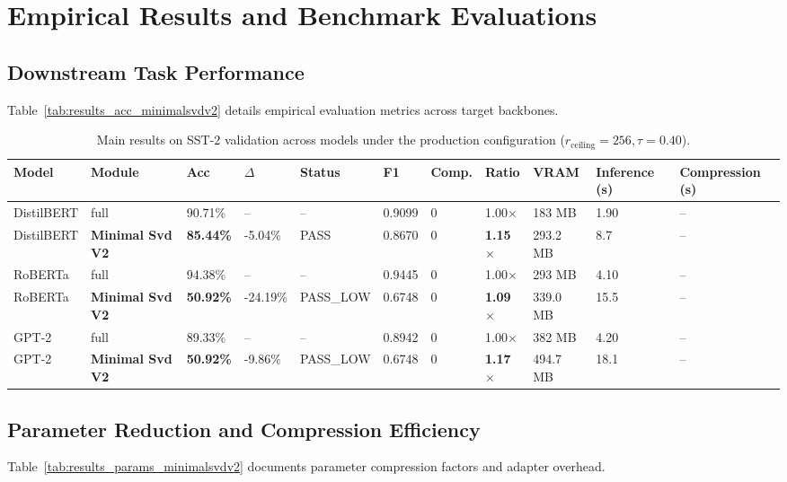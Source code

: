 \section{Empirical Results and Benchmark Evaluations}

\subsection{Downstream Task Performance}
Table~\ref{tab:results_acc_minimalsvdv2} details empirical evaluation metrics across target backbones.

\begin{table}[t]
\centering
\small
\begin{tabular}{lllllllllll}
\toprule
\textbf{Model} & \textbf{Module} & \textbf{Acc} & \textbf{$\Delta$} & \textbf{Status} & \textbf{F1} & \textbf{Comp.} & \textbf{Ratio} & \textbf{VRAM} & \textbf{Inference (s)} & \textbf{Compression (s)} \\
\midrule
DistilBERT & full & 90.71\% & -- & -- & 0.9099 & 0 & 1.00$\times$ & 183 MB & 1.90 & -- \\
DistilBERT & \textbf{Minimal Svd V2} & \textbf{85.44\%} & -5.04\% & PASS & 0.8670 & 0 & \textbf{1.15$\times$} & 293.2 MB & 8.7 & -- \\
RoBERTa & full & 94.38\% & -- & -- & 0.9445 & 0 & 1.00$\times$ & 293 MB & 4.10 & -- \\
RoBERTa & \textbf{Minimal Svd V2} & \textbf{50.92\%} & -24.19\% & PASS_LOW & 0.6748 & 0 & \textbf{1.09$\times$} & 339.0 MB & 15.5 & -- \\
GPT-2 & full & 89.33\% & -- & -- & 0.8942 & 0 & 1.00$\times$ & 382 MB & 4.20 & -- \\
GPT-2 & \textbf{Minimal Svd V2} & \textbf{50.92\%} & -9.86\% & PASS_LOW & 0.6748 & 0 & \textbf{1.17$\times$} & 494.7 MB & 18.1 & -- \\
\bottomrule
\end{tabular}
\caption{Main results on SST-2 validation across models under the production configuration ($r_{\mathrm{ceiling}}=256, \tau=0.40$).}
\label{tab:main_sst2}
\end{table}

\subsection{Parameter Reduction and Compression Efficiency}
Table~\ref{tab:results_params_minimalsvdv2} documents parameter compression factors and adapter overhead.

